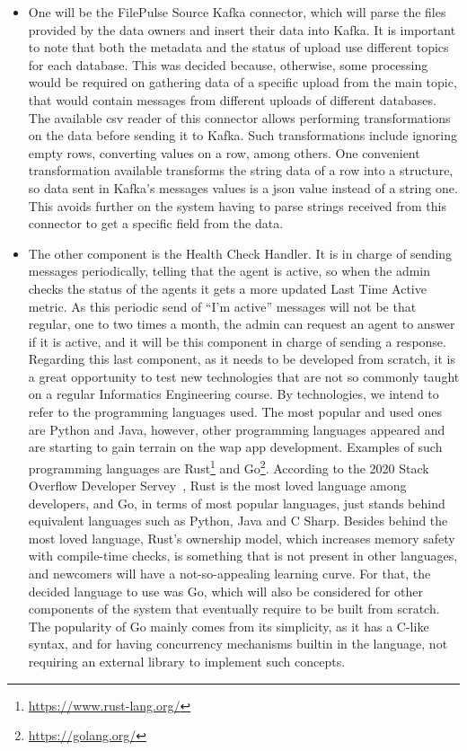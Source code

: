 \begin{itemize}
    \item One will be the FilePulse Source Kafka connector, which will parse the files provided by the data owners and insert their data into Kafka.
        It is important to note that both the metadata and the status of upload use different topics for each database.
        This was decided because, otherwise, some processing would be required on gathering data of a specific upload from the main topic, that would contain messages from different uploads of different databases.
        The available \gls{csv} reader of this connector allows performing transformations on the data before sending it to Kafka.
        Such transformations include ignoring empty rows, converting values on a row, among others.
        One convenient transformation available transforms the string data of a row into a structure, so data sent in Kafka's messages values is a \gls{json} value instead of a string one.
        This avoids further on the system having to parse strings received from this connector to get a specific field from the data.

    \item The other component is the Health Check Handler.
        It is in charge of sending messages periodically, telling that the agent is active, so when the admin checks the status of the agents it gets a more updated Last Time Active metric.
        As this periodic send of ``I'm active'' messages will not be that regular, one to two times a month, the admin can request an agent to answer if it is active, and it will be this component in charge of sending a response.
        Regarding this last component, as it needs to be developed from scratch, it is a great opportunity to test new technologies that are not so commonly taught on a regular Informatics Engineering course.
        By technologies, we intend to refer to the programming languages used.
        The most popular and used ones are Python and Java, however, other programming languages appeared and are starting to gain terrain on the wap app development.
        Examples of such programming languages are Rust\footnote{\url{https://www.rust-lang.org/}} and Go\footnote{\url{https://golang.org/}}.
        According to the 2020 Stack Overflow Developer Servey~\cite{so-survey}, Rust is the most loved language among developers, and Go, in terms of most popular languages, just stands behind equivalent languages such as Python, Java and C Sharp.
        Besides behind the most loved language, Rust's ownership model, which increases memory safety with compile-time checks, is something that is not present in other languages, and newcomers will have a not-so-appealing learning curve.
        For that, the decided language to use was Go, which will also be considered for other components of the system that eventually require to be built from scratch.
        The popularity of Go mainly comes from its simplicity, as it has a C-like syntax, and for having concurrency mechanisms builtin in the language, not requiring an external library to implement such concepts.
\end{itemize}

